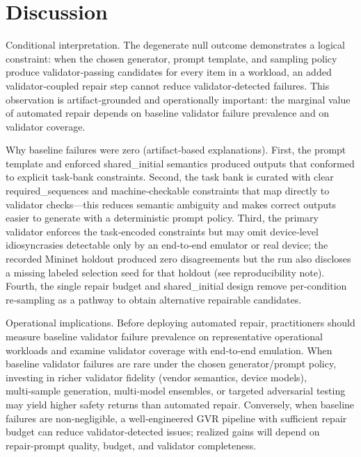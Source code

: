 \documentclass[conference]{IEEEtran}
\begin{document}
\section{Discussion}
Conditional interpretation. The degenerate null outcome demonstrates a logical constraint: when the chosen generator, prompt template, and sampling policy produce validator‑passing candidates for every item in a workload, an added validator‑coupled repair step cannot reduce validator‑detected failures. This observation is artifact‑grounded and operationally important: the marginal value of automated repair depends on baseline validator failure prevalence and on validator coverage.

Why baseline failures were zero (artifact‑based explanations). First, the prompt template and enforced shared\_initial semantics produced outputs that conformed to explicit task‑bank constraints. Second, the task bank is curated with clear required\_sequences and machine‑checkable constraints that map directly to validator checks---this reduces semantic ambiguity and makes correct outputs easier to generate with a deterministic prompt policy. Third, the primary validator enforces the task‑encoded constraints but may omit device‑level idiosyncrasies detectable only by an end‑to‑end emulator or real device; the recorded Mininet holdout produced zero disagreements but the run also discloses a missing labeled selection seed for that holdout (see reproducibility note). Fourth, the single repair budget and shared\_initial design remove per‑condition re‑sampling as a pathway to obtain alternative repairable candidates.

Operational implications. Before deploying automated repair, practitioners should measure baseline validator failure prevalence on representative operational workloads and examine validator coverage with end‑to‑end emulation. When baseline validator failures are rare under the chosen generator/prompt policy, investing in richer validator fidelity (vendor semantics, device models), multi‑sample generation, multi‑model ensembles, or targeted adversarial testing may yield higher safety returns than automated repair. Conversely, when baseline failures are non‑negligible, a well‑engineered GVR pipeline with sufficient repair budget can reduce validator‑detected issues; realized gains will depend on repair‑prompt quality, budget, and validator completeness.
\end{document}
